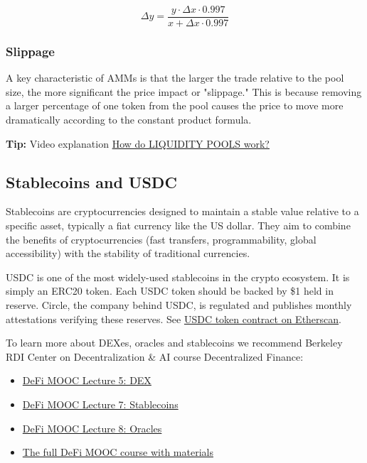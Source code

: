 \documentclass[12pt]{article}
\begin{document}
\begin{equation}
    \Delta y = \frac{y \cdot \Delta x \cdot 0.997}{x + \Delta x \cdot 0.997}
\end{equation}


\subsubsection*{Slippage}
A key characteristic of AMMs is that the larger the trade relative to the pool size, the more significant the price impact or "slippage." This is because removing a larger percentage of one token from the pool causes the price to move more dramatically according to the constant product formula.

\medskip
\noindent
\textbf{Tip:} Video explanation \href{https://www.youtube.com/watch?v=cizLhxSKrAc&t=2s}{How do LIQUIDITY POOLS work?}



\subsection*{Stablecoins and USDC}

Stablecoins are cryptocurrencies designed to maintain a stable value relative to a specific asset, typically a fiat currency like the US dollar. They aim to combine the benefits of cryptocurrencies (fast transfers, programmability, global accessibility) with the stability of traditional currencies.

USDC is one of the most widely-used stablecoins in the crypto ecosystem. It is simply an ERC20 token. Each USDC token should be backed by \$1 held in reserve. Circle, the company behind USDC, is regulated and publishes monthly attestations verifying these reserves. See \href{https://etherscan.io/token/0xa0b86991c6218b36c1d19d4a2e9eb0ce3606eb48}{USDC token contract on Etherscan}.

\medskip
\noindent
To learn more about DEXes, oracles and stablecoins we recommend Berkeley RDI Center on Decentralization \& AI course Decentralized Finance:
\begin{itemize}
\item \href{https://www.youtube.com/playlist?list=PLS01nW3RtgopoR-FHiMwfoMLT-opXlfJF}{DeFi MOOC Lecture 5: DEX}
\item \href{https://www.youtube.com/playlist?list=PLS01nW3RtgopICEFsRCvT_SIjoOtGa869}{DeFi MOOC Lecture 7: Stablecoins}
\item \href{https://www.youtube.com/playlist?list=PLS01nW3Rtgoo70DT2YsBmNUol4134S9C9}{DeFi MOOC Lecture 8: Oracles}
\item \href{https://rdi.berkeley.edu/berkeley-defi/f24}{The full DeFi MOOC course with materials}
\end{itemize}
\end{document}
